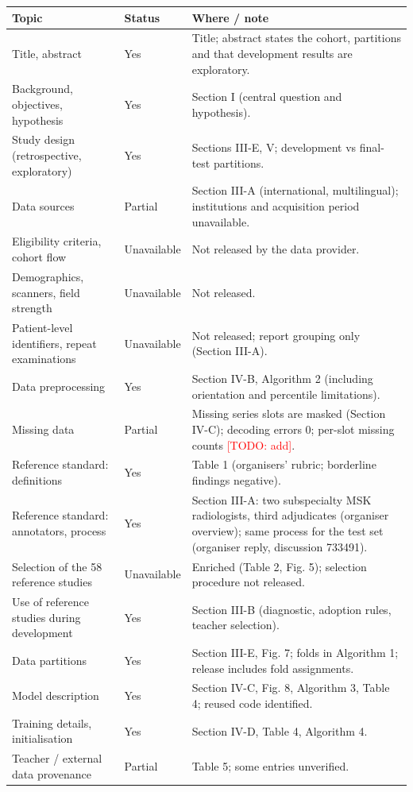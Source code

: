 \documentclass[10pt]{article}
\newcommand{\TODO}[1]{\textcolor{red}{[TODO: #1]}}
\begin{document}
\begin{longtable}{p{4.2cm}p{3.6cm}p{8.2cm}}
\toprule
Topic & Status & Where / note\\
\midrule
\endhead
Title, abstract & Yes & Title; abstract states the cohort, partitions and that development results are exploratory.\\
Background, objectives, hypothesis & Yes & Section I (central question and hypothesis).\\
Study design (retrospective, exploratory) & Yes & Sections III-E, V; development vs final-test partitions.\\
Data sources & Partial & Section III-A (international, multilingual); institutions and acquisition period unavailable.\\
Eligibility criteria, cohort flow & Unavailable & Not released by the data provider.\\
Demographics, scanners, field strength & Unavailable & Not released.\\
Patient-level identifiers, repeat examinations & Unavailable & Not released; report grouping only (Section III-A).\\
Data preprocessing & Yes & Section IV-B, Algorithm 2 (including orientation and percentile limitations).\\
Missing data & Partial & Missing series slots are masked (Section IV-C); decoding errors 0; per-slot missing counts \TODO{add}.\\
Reference standard: definitions & Yes & Table 1 (organisers' rubric; borderline findings negative).\\
Reference standard: annotators, process & Yes & Section III-A: two subspecialty MSK radiologists, third adjudicates (organiser overview); same process for the test set (organiser reply, discussion 733491).\\
Selection of the 58 reference studies & Unavailable & Enriched (Table 2, Fig. 5); selection procedure not released.\\
Use of reference studies during development & Yes & Section III-B (diagnostic, adoption rules, teacher selection).\\
Data partitions & Yes & Section III-E, Fig. 7; folds in Algorithm 1; release includes fold assignments.\\
Model description & Yes & Section IV-C, Fig. 8, Algorithm 3, Table 4; reused code identified.\\
Training details, initialisation & Yes & Section IV-D, Table 4, Algorithm 4.\\
Teacher / external data provenance & Partial & Table 5; some entries unverified.\\

\end{longtable}
\end{document}
